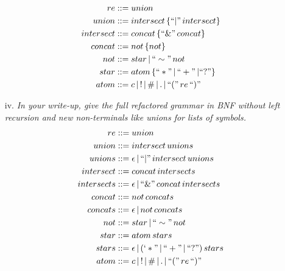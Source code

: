 \documentclass[11pt, letter]{article}
\begin{document}
\begin{itemize}
\begin{align*}
            re &::= union\\
            union &::= intersect \, \{ ``|" \, intersect \} \\
            intersect &::= concat \, \{ ``\&" \, concat \}\\
            concat &::= not \, \{not\}\\
            not &::= star \, | \, ``\sim" \, not \\
            star &::= atom \, \{ ``*" \, | \, ``+" \, | ``?" \} \\
            atom &::= c \, | \, ! \, | \, \# \, | \, . \, | \, ``(" \, re \, ``)"
        \end{align*}
        \item [iv.]\textit{In your write-up, give the full refactored grammar in BNF without left
        recursion and new non-terminals like unions for lists of symbols.}
        \begin{align*}
            re &::= union\\
            union &::= intersect \, unions \\
            unions &::= \epsilon \, | \,  ``|" \, intersect \, unions\\
            intersect &::= concat \, intersects\\
            intersects &::= \epsilon \, | \, ``\&" \, concat \, intersects\\
            concat &::= not \, concats \\
            concats &::= \epsilon \, | \, not \, concats \\
            not &::= star \, | \, ``\sim" \, not \\
            star &::= atom \, stars \\
            stars &::= \epsilon \, | \, (`*" \, | \, ``+" \, | \, ``?") \, stars \\
            atom &::= c \, | \, ! \, | \, \# \, | \, . \, | \, ``(" \, re \, ``)"
        \end{align*}
    \end{itemize}
\end{document}
